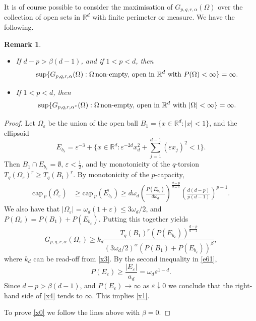 \documentclass[a4paper,9pt]{article}
\newcommand{\R}{\mathbb{R}}
\newtheorem{remark} {Remark}
\def\cp{\mathrm{cap}\,}
\newcommand{\Om}{\Omega}
\begin{document}
It is of course possible to consider the maximisation of $G_{p,q,r,\alpha}(\Om)$ over the collection of open sets in $\R^d$ with finite perimeter or measure. We have the following.
\begin{remark}\label{rem4}
\begin{itemize} \item[]If $d-p>\beta(d-1)$, and if $1<p<d$, then
\begin{equation}\label{x1}
\sup \{G_{p,q,r,\alpha}(\Om): \Om\, \textup{non-empty, open in $\R^d$ with $P(\Om)<\infty$}\}=\infty.
\end{equation}
\item[] If $1<p<d$, then
\begin{equation}\label{x0}
\sup \{G_{p,q,r,\alpha^*}(\Om): \Om\, \textup{non-empty, open in $\R^d$ with $|\Om|<\infty$}\}=\infty.
\end{equation}
\end{itemize}
\end{remark}
\begin{proof}
Let $\Omega_{\varepsilon}$ be the union of the open ball $B_1=\{x\in \R^d:|x|<1\}$, and the ellipsoid
\begin{equation}\label{x2}
E_{b_{\varepsilon}}=\varepsilon^{-3}+\{x\in\R^d: \varepsilon^{-2d}x_d^2+\sum_{j=1}^{d-1}(\varepsilon x_j)^2<1\}.
\end{equation}
Then $B_1\cap E_{b_{\varepsilon}}=\emptyset, \,\varepsilon<\frac12$, and by monotonicity of the $q$-torsion
$T_q(\Om_{\varepsilon})^r\ge T_q(B_1)^r$. By monotonicity of the $p$-capacity,
\begin{align}\label{x3}
\cp_p(\overline{\Om_{\varepsilon}})&\ge \cp_p(\overline{E_{b_{\varepsilon}}})\ge d \omega_d\left(\frac{P(E_{b_{\varepsilon}})}{d\omega_{d}}\right)^{\frac{d-p}{d-1}}\left( \frac{d(d-p)}{p(d-1)}\right)^{p-1}.
\end{align}
We also have that $|\Om_{\varepsilon}|=\omega_d(1+\varepsilon)\le 3\omega_d/2$, and $P(\Om_{\varepsilon})=P(B_1)+P(E_{b_{\varepsilon}})$.
Putting this together yields
\begin{equation}\label{x4}
G_{p,q,r,\alpha}(\Om_{\varepsilon})\ge k_d\frac{T_q(B_1)^r(P(E_{b_{\varepsilon}}))^{\frac{d-p}{d-1}}}{(3\omega_d/2)^{\alpha}(P(B_1)+P(E_{b_{\varepsilon}}))^{\beta}},
\end{equation}
where $k_d$ can be read-off from \eqref{x3}. By the second inequality in \eqref{e61},
\begin{equation}\label{x5}
P(E_{\varepsilon})\ge \frac{|E_{\varepsilon}|}{a_d}=\omega_d\varepsilon^{1-d}.
\end{equation}
Since $d-p>\beta(d-1)$, and $P(E_{\varepsilon})\rightarrow\infty$ as $\varepsilon\downarrow 0$ we conclude that the right-hand side of \eqref{x4} tends to $\infty$.
This implies \eqref{x1}.

To prove \eqref{x0} we follow the lines above with $\beta=0$.
\end{proof}
\end{document}
